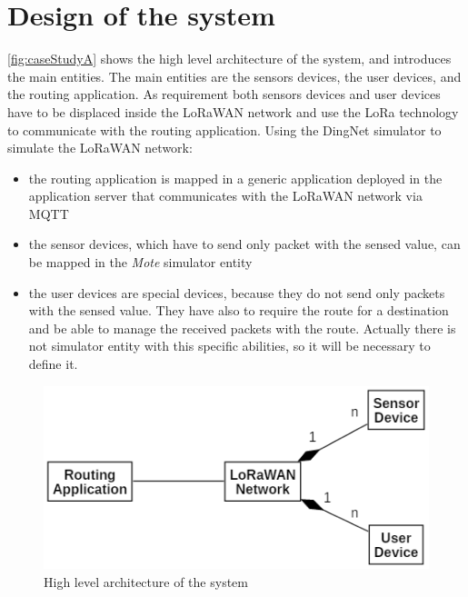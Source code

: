 \section{Design of the system}
\autoref{fig:caseStudyA} shows the high level architecture of the system, and introduces the main entities. 
The main entities are the sensors devices, the user devices, and the routing application.
As requirement both sensors devices and user devices have to be displaced inside the LoRaWAN network and use the LoRa technology to communicate with the routing application.
Using the DingNet simulator to simulate the LoRaWAN network:
\begin{itemize}
    \item the routing application is mapped in a generic application deployed in the application server that communicates with the LoRaWAN network via MQTT
    \item the sensor devices, which have to send only packet with the sensed value, can be mapped in the \textit{Mote} simulator entity
    \item the user devices are special devices, because they do not send only packets with the sensed value. They have also to require the route for a destination and be able to manage the received packets with the route. Actually there is not simulator entity with this specific abilities, so it will be necessary to define it.
\end{itemize}
% 
\begin{figure}[h]
    \centering
    \includegraphics{figures/CaseStudyA_HLarch.png}
    \caption{High level architecture of the system}
    \label{fig:caseStudyA}
\end{figure}
% 
